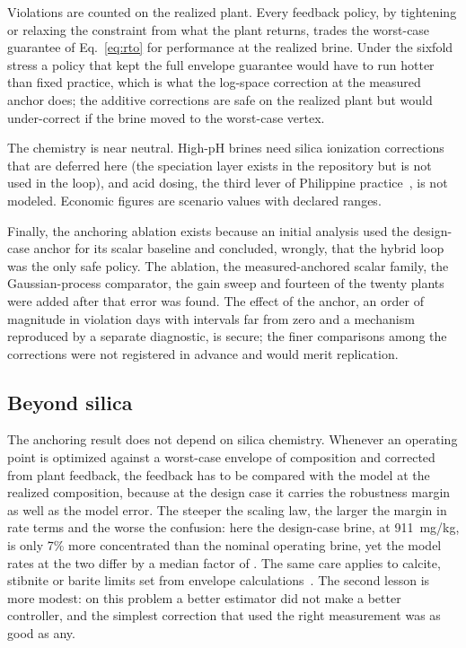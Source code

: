 Violations are counted on the realized plant. Every feedback policy, by
tightening or relaxing the constraint from what the plant returns,
trades the worst-case guarantee of Eq.~\eqref{eq:rto} for performance
at the realized brine. Under the sixfold stress a policy that kept the
full envelope guarantee would have to run hotter than fixed practice,
which is what the log-space correction at the measured anchor does; the
additive corrections are safe on the realized plant but would
under-correct if the brine moved to the worst-case vertex.

The chemistry is near neutral. High-pH brines need silica ionization
corrections that are deferred here (the speciation layer exists in the
repository but is not used in the loop), and acid dosing, the third
lever of Philippine practice~\citep{remoroza2008ph}, is not modeled.
Economic figures are scenario values with declared ranges.

Finally, the anchoring ablation exists because an initial analysis used
the design-case anchor for its scalar baseline and concluded, wrongly,
that the hybrid loop was the only safe policy. The ablation, the
measured-anchored scalar family, the Gaussian-process comparator, the
gain sweep and fourteen of the twenty plants were added after that
error was found. The effect of the anchor, an order of magnitude in
violation days with intervals far from zero and a mechanism reproduced
by a separate diagnostic, is secure; the finer comparisons among the
corrections were not registered in advance and would merit replication.

\subsection{Beyond silica}\label{sec:general}

The anchoring result does not depend on silica chemistry. Whenever an
operating point is optimized against a worst-case envelope of
composition and corrected from plant feedback, the feedback has to be
compared with the model at the realized composition, because at the
design case it carries the robustness margin as well as the model
error. The steeper the scaling law, the larger the margin in rate terms
and the worse the confusion: here the design-case brine, at 911~mg/kg,
is only 7\% more concentrated than the nominal operating brine, yet the
model rates at the two differ by a median factor of . The same care applies to calcite, stibnite or barite limits set
from envelope calculations~\citep{tonkul2021characterization,%
omrani2025probabilistic}. The second lesson is more modest: on this
problem a better estimator did not make a better controller, and the
simplest correction that used the right measurement was as good as any.
